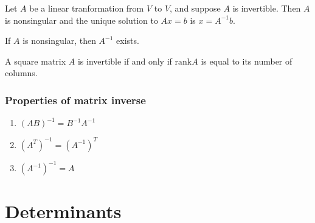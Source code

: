 \documentclass[compress]{beamer}
\newcommand{\rank}{\mathrm{rank}}
\theoremstyle{definition}
\begin{document}
\begin{frame}
  \begin{lemma}
    Let $A$ be a linear tranformation from $V$ to $V$, and suppose $A$
    is invertible. Then $A$ is nonsingular and the unique solution to
    $Ax = b$ is $x = A^{-1} b$. 
  \end{lemma}

  \begin{lemma}
    If $A$ is nonsingular, then $A^{-1}$ exists.
  \end{lemma}

  \begin{corollary}
    A square matrix $A$ is invertible if and only if $\rank A$ is
    equal to its number of columns.
  \end{corollary}
\end{frame}

\begin{frame}
  \frametitle{Properties of matrix inverse}
  \begin{enumerate}
  \item $(AB)^{-1} = B^{-1} A^{-1}$
  \item $(A^T)^{-1} = (A^{-1})^T$
  \item $(A^{-1})^{-1} = A$
  \end{enumerate}
\end{frame}

\section{Determinants}
\end{document}
